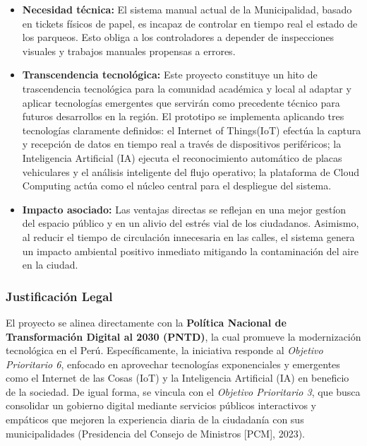 \documentclass[12pt,a4paper]{article}
\begin{document}
\begin{itemize}[leftmargin=*]
	\item \textbf{Necesidad técnica:} El sistema manual actual de la Municipalidad, basado en tickets físicos de papel, es incapaz de controlar en tiempo real el estado de los parqueos. Esto obliga a los controladores a depender de inspecciones visuales y trabajos manuales propensas a errores.
	
	\item \textbf{Transcendencia tecnológica:} Este proyecto constituye un hito de trascendencia tecnológica para la comunidad académica y local al adaptar y aplicar tecnologías emergentes que servirán como precedente técnico para futuros desarrollos en la región. El prototipo se implementa aplicando tres tecnologías claramente definidos: el Internet of Things(IoT) efectúa la captura y recepción de datos en tiempo real a través de dispositivos periféricos; la Inteligencia Artificial (IA) ejecuta el reconocimiento automático de placas vehiculares y el análisis inteligente del flujo operativo; la plataforma de Cloud Computing actúa como el núcleo central para el despliegue del sistema.
	
	\item \textbf{Impacto asociado:} Las ventajas directas se reflejan en una mejor gestíon del espacio público y en un alivio del estrés vial de los ciudadanos. Asimismo, al reducir el tiempo de circulación innecesaria en las calles, el sistema genera un impacto ambiental positivo inmediato  mitigando la contaminación del aire en la ciudad.
\end{itemize}

\subsubsection{Justificación Legal}

El proyecto se alinea directamente con la \textbf{Política Nacional de Transformación Digital al 2030 (PNTD)}, la cual promueve la modernización tecnológica en el Perú. Específicamente, la iniciativa responde al \textit{Objetivo Prioritario 6}, enfocado en aprovechar tecnologías exponenciales y emergentes como el Internet de las Cosas (IoT) y la Inteligencia Artificial (IA) en beneficio de la sociedad. De igual forma, se vincula con el \textit{Objetivo Prioritario 3}, que busca consolidar un gobierno digital mediante servicios públicos interactivos y empáticos que mejoren la experiencia diaria de la ciudadanía con sus municipalidades (Presidencia del Consejo de Ministros [PCM], 2023).
\end{document}
